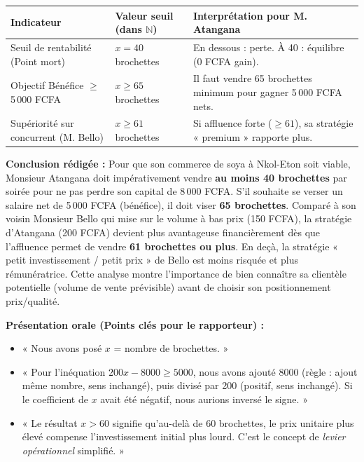 \documentclass[11pt]{article}
\begin{document}
\begin{exoresolu}
\begin{center}
\begin{tabularx}{\linewidth}{|l|X|X|}\hline
\textbf{Indicateur} & \textbf{Valeur seuil (dans $\mathbb{N}$)} & \textbf{Interprétation pour M. Atangana} \\ \hline
Seuil de rentabilité (Point mort) & $x = 40$ brochettes & En dessous : perte. À 40 : équilibre (0 FCFA gain). \\ \hline
Objectif Bénéfice $\geq$ 5\,000 FCFA & $x \geq 65$ brochettes & Il faut vendre 65 brochettes minimum pour gagner 5\,000 FCFA nets. \\ \hline
Supériorité sur concurrent (M. Bello) & $x \geq 61$ brochettes & Si affluence forte ($\geq 61$), sa stratégie « premium » rapporte plus. \\ \hline
\end{tabularx}
\end{center}

\noindent \textbf{Conclusion rédigée :}
Pour que son commerce de soya à Nkol-Eton soit viable, Monsieur Atangana doit impérativement vendre \textbf{au moins 40 brochettes} par soirée pour ne pas perdre son capital de 8\,000 FCFA. S'il souhaite se verser un salaire net de 5\,000 FCFA (bénéfice), il doit viser \textbf{65 brochettes}. Comparé à son voisin Monsieur Bello qui mise sur le volume à bas prix (150 FCFA), la stratégie d'Atangana (200 FCFA) devient plus avantageuse financièrement dès que l'affluence permet de vendre \textbf{61 brochettes ou plus}. En deçà, la stratégie « petit investissement / petit prix » de Bello est moins risquée et plus rémunératrice. Cette analyse montre l'importance de bien connaître sa clientèle potentielle (volume de vente prévisible) avant de choisir son positionnement prix/qualité.

\medskip
\noindent \textbf{Présentation orale (Points clés pour le rapporteur) :}
\begin{itemize}
    \item « Nous avons posé $x$ = nombre de brochettes. »
    \item « Pour l'inéquation $200x - 8000 \geq 5000$, nous avons ajouté 8000 (règle : ajout même nombre, sens inchangé), puis divisé par 200 (positif, sens inchangé). Si le coefficient de $x$ avait été négatif, nous aurions inversé le signe. »
    \item « Le résultat $x > 60$ signifie qu'au-delà de 60 brochettes, le prix unitaire plus élevé compense l'investissement initial plus lourd. C'est le concept de \emph{levier opérationnel} simplifié. »
\end{itemize}
\end{exoresolu}
\end{document}
